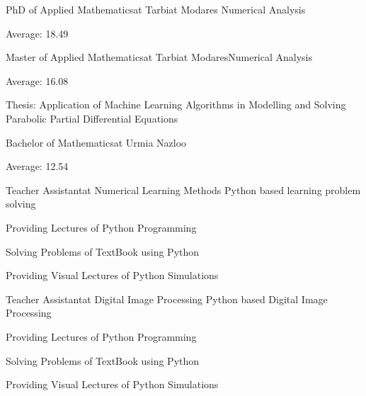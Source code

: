 \begin{minipage}{0.7125\textwidth} %
	\begin{tcolorbox}[height=0.8\textheight, grow to left by=0.55cm,colframe=white,colback=white]

		{PhD of Applied Mathematics}{at Tarbiat Modares}
		{Numerical Analysis}
		{ \begin{compactitem}[-]
				\item Average: 18.49
			\end{compactitem}
		}

		{Master of Applied Mathematics}{at Tarbiat Modares}{Numerical Analysis}
		{\begin{compactitem}[-]
				\item Average: 16.08
				\item Thesis:
				Application of Machine Learning Algorithms in Modelling and Solving Parabolic Partial Differential Equations
			\end{compactitem}
		}

		{Bachelor of Mathematics}{at Urmia Nazloo}
		{\begin{compactitem}[-]
				\item Average: 12.54
			\end{compactitem}
		}





		{Teacher Assistant}{at Numerical Learning Methods}
		{Python based learning problem solving}
		{\begin{compactitem}[-]
				\item Providing Lectures of Python Programming
				\item Solving Problems of TextBook using Python
				\item Providing Visual Lectures of Python Simulations
			\end{compactitem}
		}

		{Teacher Assistant}{at Digital Image Processing}
		{Python based Digital Image Processing}
		{\begin{compactitem}[-]
				\item Providing Lectures of Python Programming
				\item Solving Problems of TextBook using Python
				\item Providing Visual Lectures of Python Simulations
			\end{compactitem}
		}


\end{tcolorbox}
\end{minipage}
